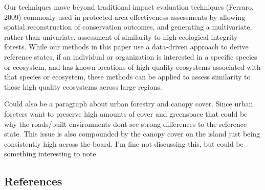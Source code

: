 \documentclass[
]{agujournal2019}
\begin{document}
Our techniques move beyond traditional impact evaluation techniques
(Ferraro, 2009) commonly used in protected area effectiveness
assessments by allowing spatial reconstruction of conservation outcomes,
and generating a multivariate, rather than univariate, assessment of
similarity to high ecological integrity forests. While our methods in
this paper use a data-driven approach to derive reference states, if an
individual or organization is interested in a specific species or
ecosystem, and has known locations of high quality ecosystems associated
with that species or ecosystem, these methods can be applied to assess
similarity to those high quality ecosystems across large regions.

Could also be a paragraph about urban forestry and canopy cover. Since
urban foreters want to preserve high amounts of cover and greenspace
that could be why the roads/built environments dont see strong
differences to the reference state. This issue is also compounded by the
canopy cover on the island just being consistently high across the
board. I'm fine not discussing this, but could be something interesting
to note

\subsection*{References}\label{references}
\end{document}
